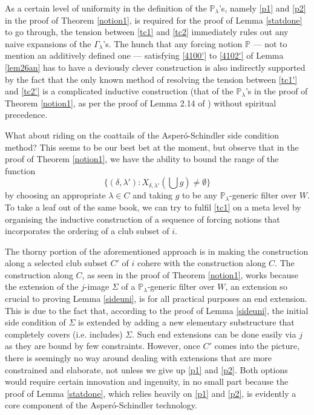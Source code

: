 \documentclass[12pt, twoside]{memoir}
\numberwithin{equation}{section}
\theoremstyle{definition}
\theoremstyle{remark}
\theoremstyle{definition}
\theoremstyle{definition}
\theoremstyle{definition}
\theoremstyle{remark}
\begin{document}
As a certain level of uniformity in the definition of the $\mathbb{P}_{\lambda}$'s, namely \ref{p1} and \ref{p2} in the proof of Theorem \ref{notion1}, is required for the proof of Lemma \ref{statdone} to go through, the tension between \ref{tc1} and \ref{tc2} immediately rules out any naive expansions of the $\Gamma_{\lambda}$'s. The hunch that any forcing notion $\mathbb{P}$ --- not to mention an additively defined one --- satisfying \ref{4100'} to \ref{4102'} of Lemma \ref{lem26an} has to have a deviously clever construction is also indirectly supported by the fact that the only known method of resolving the tension between \ref{tc1'} and \ref{tc2'} is a complicated inductive construction (that of the $\mathbb{P}_{\lambda}$'s in the proof of Theorem \ref{notion1}, as per the proof of Lemma 2.14 of \cite{schindler}) without spiritual precedence.

What about riding on the coattails of the Asper\'{o}-Schindler side condition method? This seems to be our best bet at the moment, but observe that in the proof of Theorem \ref{notion1}, we have the ability to bound the range of the function
\begin{equation*}
    \{(\delta, \lambda') : X_{\delta, \lambda'}(\bigcup g) \neq \emptyset\}
\end{equation*}
by choosing an appropriate $\lambda \in C$ and taking $g$ to be any $\mathbb{P}_{\lambda}$-generic filter over $W$. To take a leaf out of the same book, we can try to fulfil \ref{tc1} on a meta level by organising the inductive construction of a sequence of forcing notions that incorporates the ordering of a club subset of $i$. 

The thorny portion of the aforementioned approach is in making the construction along a selected club subset $C'$ of $i$ cohere with the construction along $C$. The construction along $C$, as seen in the proof of Theorem \ref{notion1}, works because the extension of the $j$-image $\Sigma$ of a $\mathbb{P}_{\lambda}$-generic filter over $W$, an extension so crucial to proving Lemma \ref{sideuni}, is for all practical purposes an end extension. This is due to the fact that, according to the proof of Lemma \ref{sideuni}, the initial side condition of $\Sigma$ is extended by adding a new elementary substructure that completely covers (i.e. includes) $\Sigma$. Such end extensions can be done easily via $j$ as they are bound by few constraints. However, once $C'$ comes into the picture, there is seemingly  no way around dealing with extensions that are more constrained and elaborate, not unless we give up \ref{p1} and \ref{p2}. Both options would require certain innovation and ingenuity, in no small part because the proof of Lemma \ref{statdone}, which relies heavily on \ref{p1} and \ref{p2}, is evidently a core component of the Asper\'{o}-Schindler technology.
\end{document}
